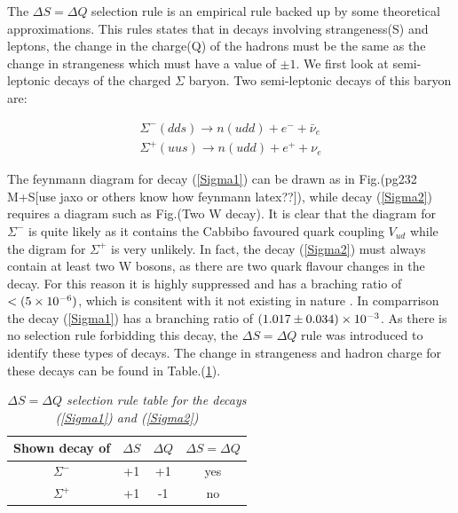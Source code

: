 The $\Delta S = \Delta Q$ selection rule is an empirical rule backed up by some theoretical approximations. This rules states that in decays involving strangeness(S) and leptons, the change in the charge(Q) of the hadrons must be the same as the change in strangeness which must have a value of $\pm 1$. We first look at semi-leptonic decays of the charged $\Sigma$ baryon. Two semi-leptonic decays of this baryon are:

\begin{align}
\label{Sigma1}
\Sigma^{-} (dds) \rightarrow n(udd) + e^{-} + \bar{\nu}_{e} \\
\label{Sigma2}
\Sigma^{+} (uus) \rightarrow n(udd) + e^{+} + \nu_{e}
\end{align}  

\noindent The feynmann diagram for decay (\ref{Sigma1}) can be drawn as in Fig.(pg232 M+S[use jaxo or others know how feynmann latex??]), while decay (\ref{Sigma2}) requires a diagram such as Fig.(Two W decay). It is clear that the diagram for $\Sigma^{-}$ is quite likely as it contains the Cabbibo favoured quark coupling $V_{ud}$ while the digram for $\Sigma^{+}$ is very unlikely. In fact, the decay (\ref{Sigma2}) must always contain at least two W bosons, as there are two quark flavour changes in the decay. For this reason it is highly suppressed and has a braching ratio of $< (5\times 10^{-6})$, which is consitent with it not existing in nature \cite{PDGKaons}. In comparrison the decay (\ref{Sigma1}) has a branching ratio of $(1.017 \pm 0.034) \times 10^{-3}$. As there is no selection rule forbidding this decay, the $\Delta S = \Delta Q$ rule was introduced to identify these types of decays. The change in strangeness and hadron charge for these decays can be found in Table.(\ref{DeltaSQruleTable}).

\begin{table}[h!]
\caption{\textit{$\Delta S = \Delta Q$ selection rule table for the decays (\ref{Sigma1}) and (\ref{Sigma2})}}
\centering
\setlength{\tabcolsep}{10pt}
\begin{tabular}{c| ccc}
\hline
Shown decay of   & $\Delta S$ & $\Delta Q$ & $\Delta S = \Delta Q$ \\ 
\hline \hline
$\Sigma^{-}$     &      +1    &    +1      & yes                   \\
$\Sigma^{+}$     &      +1    &    -1      & no                   \\
\hline
\end{tabular} 
\label{DeltaSQruleTable}
\end{table}

